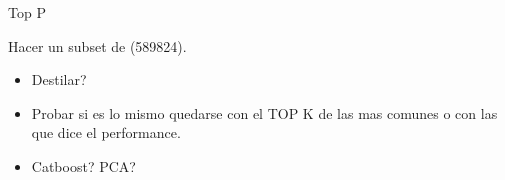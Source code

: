 Top P

Hacer un subset de  (589824).

\begin{itemize}
\item Destilar?
\item Probar si es lo mismo quedarse con el TOP K de las mas comunes o con las que dice el performance.
\item Catboost? PCA?
\end{itemize}



